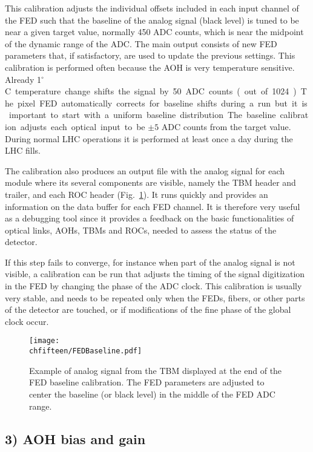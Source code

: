 This calibration adjusts the individual offsets included in each input channel of the FED such that the baseline of the analog signal (black level) is tuned to be near a given target value, normally 450 ADC counts, which is near the midpoint of the dynamic range of the ADC. The main output consists of new FED parameters that, if satisfactory, are used to update the previous settings.
This calibration is performed often because the AOH is very temperature sensitive. Already 1\unit{$^\circ$C} temperature change shifts the signal by 50 ADC counts (out of 1024).
The pixel FED automatically corrects for baseline shifts during a run but it is important to start with a uniform baseline distribution.
The baseline calibration adjusts each optical input to be $\pm5$ ADC counts from the target value. During normal LHC operations it is performed at least once a day during the LHC fills.

The calibration also produces an output file with the analog signal for each module where its several components are visible, namely the TBM header and trailer, and each ROC header (Fig.~\ref{fig:FEDBaseline}).
It runs quickly and provides an information on the data buffer for each FED channel. It is therefore very useful as a debugging tool since it provides a feedback on the basic functionalities of optical links, AOHs, TBMs and ROCs, needed to assess the status of the detector.

If this step fails to converge, for instance when part of the analog signal is not visible, a calibration can be run that adjusts the timing of the signal digitization in the FED by changing the phase of the ADC clock.
This calibration is usually very stable, and needs to be repeated only when the FEDs, fibers, or other parts of the detector are touched, or if modifications of the fine phase of the global clock occur.

\begin{figure}[!htb]
 \begin{center}
 \texttt{[image: \\chfifteen/FEDBaseline.pdf]}
 \end{center}
 \caption{Example of analog signal from the TBM displayed at the end of the FED baseline calibration. The FED parameters are adjusted to center the baseline (or black level) in the middle of the FED ADC range.}
 \label{fig:FEDBaseline}
\end{figure}

\subsection*{3) AOH bias and gain}

